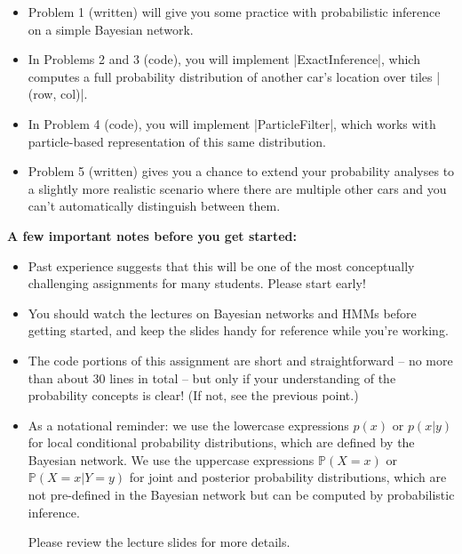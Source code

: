 \begin{itemize}
  \item Problem 1 (written) will give you some practice with probabilistic
  inference on a simple Bayesian network.
  \item In Problems 2 and 3 (code), you will implement |ExactInference|, which
  computes a full probability distribution of another car's location over tiles
  |(row, col)|.
  \item In Problem 4 (code), you will implement |ParticleFilter|, which works
  with particle-based representation of this same distribution.
  \item Problem 5 (written) gives you a chance to extend your probability analyses
  to a slightly more realistic scenario where there are multiple other cars and
  you can't automatically distinguish between them.
\end{itemize}
\clearpage

{\bf A few important notes before you get started: }  

\begin{itemize}
\item Past experience suggests that this will be one of the most conceptually
  challenging assignments for many students.  Please start early!
\item You should watch the lectures on Bayesian
networks and HMMs before getting started, and keep the slides handy for
reference while you're working.
\item The code portions of this assignment are short and straightforward -- no
more than about 30 lines in total -- but only if your understanding of the
probability concepts is clear!  (If not, see the previous point.)
\item As a notational reminder: we use the lowercase expressions $p(x)$ or
$p(x\vert y)$ for local conditional probability distributions, which are defined by
the Bayesian network.  We use the uppercase expressions $\mathbb P(X = x)$ or
$\mathbb P(X = x \vert Y = y)$ for joint and posterior probability distributions,
which are not pre-defined in the Bayesian network but can be computed by
probabilistic inference.

Please review the lecture slides for more details.
\end{itemize}

